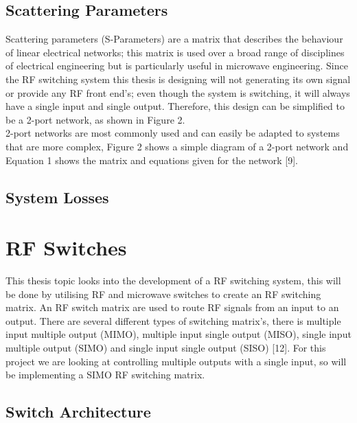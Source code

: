 \documentclass[12pt,openany,a4paper]{book}
\begin{document}
\subsection{Scattering Parameters}
Scattering parameters (S-Parameters) are a matrix that describes the behaviour of linear electrical networks; this matrix is used over a broad range of disciplines of electrical engineering but is particularly useful in microwave engineering.
Since the RF switching system this thesis is designing will not generating its own signal or provide any RF front end's; even though the system is switching, it will always have a single input and single output. Therefore, this design can be simplified to be a 2-port network, as shown in Figure 2.\\[0.1cm]
2-port networks are most commonly used and can easily be adapted to systems that are more complex, Figure 2 shows a simple diagram of a 2-port network and Equation 1 shows the matrix and equations given for the network [9].

\subsection{System Losses}










\section{RF Switches}
This thesis topic looks into the development of a RF switching system, this will be done by utilising RF and microwave switches to create an RF switching matrix. An RF switch matrix are used to route RF signals from an input to an output.
There are several different types of switching matrix's, there is multiple input multiple output (MIMO), multiple input single output (MISO), single input multiple output (SIMO) and single input single output (SISO) [12]. For this project we are looking at controlling multiple outputs with a single input, so will be implementing a SIMO RF switching matrix.

\subsection{Switch Architecture}
\end{document}
